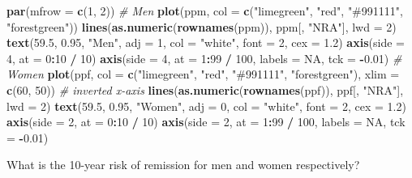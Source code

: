 \documentclass[
]{book}
\newenvironment{Shaded}{\begin{snugshade}}{\end{snugshade}}
\newcommand{\AttributeTok}[1]{\textcolor[rgb]{0.13,0.29,0.53}{#1}}
\newcommand{\CommentTok}[1]{\textcolor[rgb]{0.56,0.35,0.01}{\textit{#1}}}
\newcommand{\ConstantTok}[1]{\textcolor[rgb]{0.56,0.35,0.01}{#1}}
\newcommand{\DecValTok}[1]{\textcolor[rgb]{0.00,0.00,0.81}{#1}}
\newcommand{\FloatTok}[1]{\textcolor[rgb]{0.00,0.00,0.81}{#1}}
\newcommand{\FunctionTok}[1]{\textcolor[rgb]{0.13,0.29,0.53}{\textbf{#1}}}
\newcommand{\NormalTok}[1]{#1}
\newcommand{\SpecialCharTok}[1]{\textcolor[rgb]{0.81,0.36,0.00}{\textbf{#1}}}
\newcommand{\StringTok}[1]{\textcolor[rgb]{0.31,0.60,0.02}{#1}}
\begin{document}
\begin{enumerate}
\begin{Shaded}
\begin{Highlighting}[]
\FunctionTok{par}\NormalTok{(}\AttributeTok{mfrow =} \FunctionTok{c}\NormalTok{(}\DecValTok{1}\NormalTok{, }\DecValTok{2}\NormalTok{))}
\CommentTok{\# Men}
\FunctionTok{plot}\NormalTok{(ppm, }\AttributeTok{col =} \FunctionTok{c}\NormalTok{(}\StringTok{"limegreen"}\NormalTok{, }\StringTok{"red"}\NormalTok{, }\StringTok{"\#991111"}\NormalTok{, }\StringTok{"forestgreen"}\NormalTok{))}
\FunctionTok{lines}\NormalTok{(}\FunctionTok{as.numeric}\NormalTok{(}\FunctionTok{rownames}\NormalTok{(ppm)), ppm[, }\StringTok{"NRA"}\NormalTok{], }\AttributeTok{lwd =} \DecValTok{2}\NormalTok{)}
\FunctionTok{text}\NormalTok{(}\FloatTok{59.5}\NormalTok{, }\FloatTok{0.95}\NormalTok{, }\StringTok{"Men"}\NormalTok{, }\AttributeTok{adj =} \DecValTok{1}\NormalTok{, }\AttributeTok{col =} \StringTok{"white"}\NormalTok{, }\AttributeTok{font =} \DecValTok{2}\NormalTok{, }\AttributeTok{cex =} \FloatTok{1.2}\NormalTok{)}
\FunctionTok{axis}\NormalTok{(}\AttributeTok{side =} \DecValTok{4}\NormalTok{, }\AttributeTok{at =} \DecValTok{0}\SpecialCharTok{:}\DecValTok{10} \SpecialCharTok{/} \DecValTok{10}\NormalTok{)}
\FunctionTok{axis}\NormalTok{(}\AttributeTok{side =} \DecValTok{4}\NormalTok{, }\AttributeTok{at =} \DecValTok{1}\SpecialCharTok{:}\DecValTok{99} \SpecialCharTok{/} \DecValTok{100}\NormalTok{, }\AttributeTok{labels =} \ConstantTok{NA}\NormalTok{, }\AttributeTok{tck =} \SpecialCharTok{{-}}\FloatTok{0.01}\NormalTok{)}
\CommentTok{\# Women }
\FunctionTok{plot}\NormalTok{(ppf, }\AttributeTok{col =} \FunctionTok{c}\NormalTok{(}\StringTok{"limegreen"}\NormalTok{, }\StringTok{"red"}\NormalTok{, }\StringTok{"\#991111"}\NormalTok{, }\StringTok{"forestgreen"}\NormalTok{),}
          \AttributeTok{xlim =} \FunctionTok{c}\NormalTok{(}\DecValTok{60}\NormalTok{, }\DecValTok{50}\NormalTok{)) }\CommentTok{\# inverted x{-}axis}
\FunctionTok{lines}\NormalTok{(}\FunctionTok{as.numeric}\NormalTok{(}\FunctionTok{rownames}\NormalTok{(ppf)), ppf[, }\StringTok{"NRA"}\NormalTok{], }\AttributeTok{lwd =} \DecValTok{2}\NormalTok{)}
\FunctionTok{text}\NormalTok{(}\FloatTok{59.5}\NormalTok{, }\FloatTok{0.95}\NormalTok{, }\StringTok{"Women"}\NormalTok{, }\AttributeTok{adj =} \DecValTok{0}\NormalTok{, }\AttributeTok{col =} \StringTok{"white"}\NormalTok{, }\AttributeTok{font =} \DecValTok{2}\NormalTok{, }\AttributeTok{cex =} \FloatTok{1.2}\NormalTok{)}
\FunctionTok{axis}\NormalTok{(}\AttributeTok{side =} \DecValTok{2}\NormalTok{, }\AttributeTok{at =} \DecValTok{0}\SpecialCharTok{:}\DecValTok{10} \SpecialCharTok{/} \DecValTok{10}\NormalTok{)}
\FunctionTok{axis}\NormalTok{(}\AttributeTok{side =} \DecValTok{2}\NormalTok{, }\AttributeTok{at =} \DecValTok{1}\SpecialCharTok{:}\DecValTok{99} \SpecialCharTok{/} \DecValTok{100}\NormalTok{, }\AttributeTok{labels =} \ConstantTok{NA}\NormalTok{, }\AttributeTok{tck =} \SpecialCharTok{{-}}\FloatTok{0.01}\NormalTok{)}
\end{Highlighting}
\end{Shaded}

  What is the 10-year risk of remission for men and women respectively?
\end{enumerate}


\end{document}
